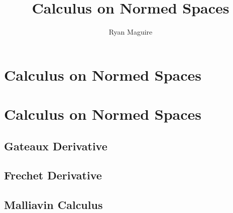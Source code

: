 \documentclass[crop=false,class=book,oneside]{standalone}
\begin{document}
    \ifx\ifmathcourses\undefined
        \title{Calculus on Normed Spaces}
        \author{Ryan Maguire}
        \date{\vspace{-5ex}}
        \maketitle
        \tableofcontents
        \clearpage
        \chapter*{Calculus on Normed Spaces}
        \vspace{10ex}
        \setcounter{chapter}{1}
    \else
        \chapter{Calculus on Normed Spaces}
    \fi
    \section{Gateaux Derivative}
    \section{Frechet Derivative}
    \section{Malliavin Calculus}
\end{document}
